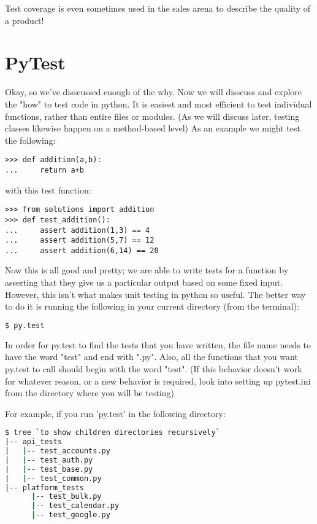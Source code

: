 Test coverage is even sometimes used in the sales arena to describe the quality of a product!

\section*{PyTest}

Okay, so we've disscussed enough of the why. Now we will disscuss and explore the "how" to test code in python.
It is easiest and most efficient to test individual functions, rather than entire files or modules.
(As we will discuss later, testing classes likewise happen on a method-based level)
As an example we might test the following:
\begin{lstlisting}
>>> def addition(a,b):
...     return a+b
\end{lstlisting}
with this test function:
\begin{lstlisting}
>>> from solutions import addition
>>> def test_addition():
...     assert addition(1,3) == 4
...     assert addition(5,7) == 12
...     assert addition(6,14) == 20
\end{lstlisting}

Now this is all good and pretty; we are able to write tests for a function by asserting that they give us a particular output based on some fixed input.
However, this isn't what makes unit testing in python so useful. The better way to do it is running the following in your current directory (from the terminal):
\begin{lstlisting}[language=bash]
  $ py.test
\end{lstlisting}

\begin{info}
In order for py.test to find the tests that you have written, the file name needs to have the word "test" and end with ".py".
Also, all the functions that you want py.test to call should begin with the word "test".
(If this behavior doesn't work for whatever reason, or a new behavior is required, look into setting up pytest.ini from the directory where you will be testing)\\
\end{info}

For example, if you run 'py.test' in the following directory:
\begin{lstlisting}[language=bash]
$ tree `to show children directories recursively`
|-- api_tests
|   |-- test_accounts.py
|   |-- test_auth.py
|   |-- test_base.py
|   |-- test_common.py
|-- platform_tests
      |-- test_bulk.py
      |-- test_calendar.py
      |-- test_google.py
\end{lstlisting}

